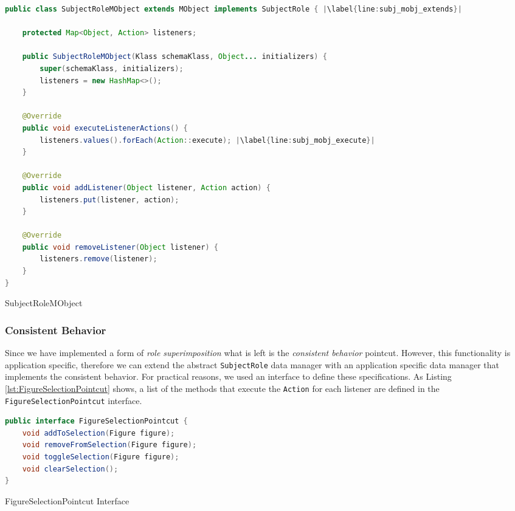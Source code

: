 \begin{sourcecode} [H]
	\begin{lstlisting}[language=Java, escapechar=|]
public class SubjectRoleMObject extends MObject implements SubjectRole { |\label{line:subj_mobj_extends}|

	protected Map<Object, Action> listeners;

	public SubjectRoleMObject(Klass schemaKlass, Object... initializers) {
		super(schemaKlass, initializers);
		listeners = new HashMap<>();
	}

	@Override
	public void executeListenerActions() {
		listeners.values().forEach(Action::execute); |\label{line:subj_mobj_execute}|
	}

	@Override
	public void addListener(Object listener, Action action) {
		listeners.put(listener, action);
	}

	@Override
	public void removeListener(Object listener) {
		listeners.remove(listener);
	}
}
	\end{lstlisting}
	\caption{SubjectRoleMObject}
	\label{lst:SubjectRoleMObject}
\end{sourcecode}

\subsubsection{Consistent Behavior}
Since we have implemented a form of \textit{role superimposition} what is left is the \textit{consistent behavior} pointcut.
However, this functionality is application specific, therefore we can extend the abstract \texttt{SubjectRole} data manager with an application specific data manager that implements the consistent behavior.
For practical reasons, we used an interface to define these specifications.
As Listing \ref{lst:FigureSelectionPointcut} shows, a list of the methods that execute the \texttt{Action} for each listener are defined in the \texttt{FigureSelectionPointcut} interface. 

\begin{sourcecode} [H]
	\begin{lstlisting}[language=Java, escapechar=|]
public interface FigureSelectionPointcut {
	void addToSelection(Figure figure);
	void removeFromSelection(Figure figure);
	void toggleSelection(Figure figure);
	void clearSelection();
}
	\end{lstlisting}
	\caption{FigureSelectionPointcut Interface}
	\label{lst:FigureSelectionPointcut}
\end{sourcecode}

